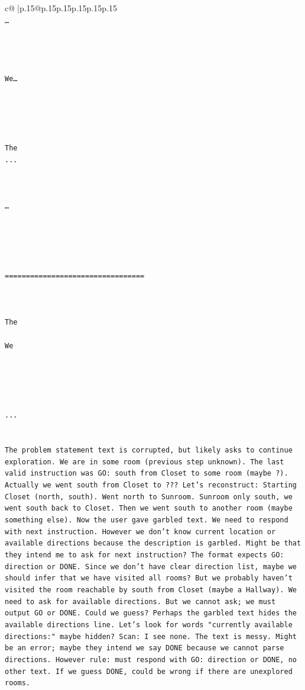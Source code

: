 \documentclass{article}
\begin{document}
{\begin{supertabular}{c@{$\;$}|p{.15\linewidth}@{}p{.15\linewidth}p{.15\linewidth}p{.15\linewidth}p{.15\linewidth}p{.15\linewidth}}
{{{\\ 
\texttt{…} \\
\\ 
\\ 
\\ 
\\ 
\texttt{We… } \\
\\ 
\\ 
\\ 
\\ 
\\ 
\texttt{The } \\
\texttt{...} \\
\\ 
\\ 
\\ 
\texttt{…} \\
\\ 
\\ 
\\ 
\\ 
\\ 
\texttt{=================================} \\
\\ 
\\ 
\\ 
\texttt{The} \\
\\ 
\texttt{We} \\
\\ 
\\ 
\\ 
\\ 
\\ 
\texttt{...} \\
\\ 
\\ 
\texttt{The problem statement text is corrupted, but likely asks to continue exploration. We are in some room (previous step unknown). The last valid instruction was GO: south from Closet to some room (maybe ?). Actually we went south from Closet to ??? Let's reconstruct: Starting Closet (north, south). Went north to Sunroom. Sunroom only south, we went south back to Closet. Then we went south to another room (maybe something else). Now the user gave garbled text. We need to respond with next instruction. However we don't know current location or available directions because the description is garbled. Might be that they intend me to ask for next instruction? The format expects GO: direction or DONE. Since we don't have clear direction list, maybe we should infer that we have visited all rooms? But we probably haven't visited the room reachable by south from Closet (maybe a Hallway). We need to ask for available directions. But we cannot ask; we must output GO or DONE. Could we guess? Perhaps the garbled text hides the available directions line. Let's look for words "currently available directions:" maybe hidden? Scan: I see none. The text is messy. Might be an error; maybe they intend we say DONE because we cannot parse directions. However rule: must respond with GO: direction or DONE, no other text. If we guess DONE, could be wrong if there are unexplored rooms.} \\
}}}
\end{supertabular}}
\end{document}
